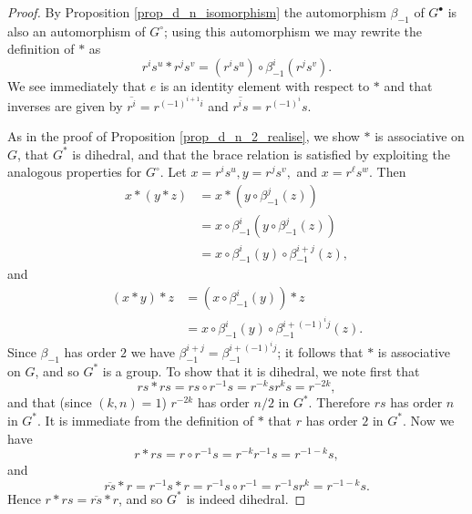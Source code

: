 \documentclass[10pt,a4paper]{amsart}
\renewcommand{\bar}{\overline}
\begin{document}
\begin{proof}
By Proposition \ref{prop_d_n_isomorphism} the automorphism $ \beta_{-1} $ of $ G^{\bullet} $ is also an automorphism of $ G^{\circ} $; using this automorphism we may rewrite the definition of $ \ast $ as 
\[ r^{i}s^{u} \ast r^{j}s^{v} = \left( r^{i}s^{u} \right) \circ \beta_{-1}^{i}\left( r^{j}s^{v} \right). \]
We see immediately that $ e $ is an identity element with respect to $ \ast $ and that inverses are given by $ \bar{r^{i}} = r^{(-1)^{i+1}i} $ and $ \bar{r^{i}s} = r^{(-1)^{i}}s $. 

As in the proof of Proposition \ref{prop_d_n_2_realise}, we show $ \ast $ is associative on $ G $, that $ G^{\ast} $ is dihedral, and that the brace relation is satisfied by exploiting the analogous properties for $ G^{\circ} $. Let $ x=r^{i}s^{u}, y=r^{j}s^{v}, $ and $ x = r^{\ell}s^{w} $. Then
\begin{align*}
x \ast (y \ast z) &= x \ast (y \circ \beta_{-1}^{j}(z)) \\
&= x \circ \beta_{-1}^{i}(y \circ \beta_{-1}^{j}(z)) \\
&= x \circ \beta_{-1}^{i}(y) \circ \beta_{-1}^{i+j}(z), 
\end{align*}
and
\begin{align*}
(x \ast y) \ast z &= (x \circ \beta_{-1}^{i}(y)) \ast z \\
&= x \circ \beta_{-1}^{i}(y) \circ \beta_{-1}^{i+(-1)^{i}j}(z). 
\end{align*}
Since $ \beta_{-1} $ has order $ 2 $ we have $ \beta_{-1}^{i+j} = \beta_{-1}^{i+(-1)^{i}j} $; it follows that $ \ast $ is associative on $ G $, and so $ G^{\ast} $ is a group. To show that it is dihedral, we note first that 
\[ rs \ast rs = rs \circ r^{-1}s = r^{-k}sr^{k}s = r^{-2k}, \]
and that (since $ (k,n)=1 $) $ r^{-2k} $ has order $ n/2 $ in $ G^{\ast} $. Therefore $ rs $ has order $ n $ in $ G^{\ast} $. It is immediate from the definition of $ \ast $ that $ r $ has order $ 2 $ in $ G^{\ast} $. Now we have
\[ r \ast rs = r \circ r^{-1}s = r^{-k}r^{-1}s = r^{-1-k}s, \]
and
\[ \bar{rs} \ast r = r^{-1}s \ast r = r^{-1}s \circ r^{-1} = r^{-1}sr^{k} = r^{-1-k}s. \]
Hence $ r \ast rs = \bar{rs} \ast r $, and so $ G^{\ast} $ is indeed dihedral. 


\end{proof}
\end{document}
